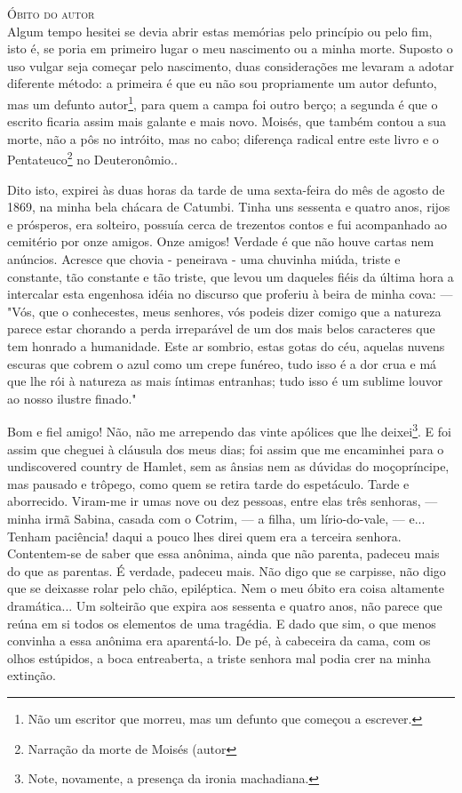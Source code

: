 \begin{corollary}[Capítulo I]
\textsc{Óbito do autor} \\

Algum tempo hesitei se devia abrir estas memórias pelo princípio ou pelo fim, isto é, se poria em primeiro lugar o meu nascimento ou a minha morte. Suposto o uso vulgar seja começar pelo nascimento, duas considerações me levaram a adotar diferente método: a primeira é que eu não sou propriamente um autor defunto, mas um defunto autor\footnote{Não um escritor que morreu, mas um defunto que começou a escrever.}, para quem a campa foi outro berço; a segunda é que o escrito ficaria assim mais galante e mais novo. Moisés, que também contou a sua morte, não a pôs no intróito, mas no cabo; diferença radical entre este livro e o Pentateuco\footnote{Narração da morte de Moisés (autor} no Deuteronômio..

Dito isto, expirei às duas horas da tarde de uma sexta-feira do mês de agosto de 1869, na minha bela chácara de Catumbi. Tinha uns sessenta e quatro anos, rijos e prósperos, era solteiro, possuía cerca de trezentos contos e fui acompanhado ao cemitério por onze amigos. Onze amigos! Verdade é que não houve cartas nem anúncios. Acresce que chovia - peneirava - uma chuvinha miúda, triste e constante, tão constante e tão triste, que levou um daqueles fiéis da última hora a intercalar esta engenhosa idéia no discurso que proferiu à beira de minha cova: — "Vós, que o conhecestes, meus senhores, vós podeis dizer comigo que a natureza parece estar chorando a perda irreparável de um dos mais belos caracteres que tem honrado a humanidade. Este ar sombrio, estas gotas do céu, aquelas nuvens escuras que cobrem o azul como um crepe funéreo, tudo isso é a dor crua e má que lhe rói à natureza as mais íntimas entranhas; tudo isso é um sublime louvor ao nosso ilustre finado."

Bom e fiel amigo! Não, não me arrependo das vinte apólices que lhe deixei\footnote{Note, novamente, a presença da ironia machadiana.}. E foi assim que cheguei à cláusula dos meus dias; foi assim que me encaminhei para o undiscovered country de Hamlet, sem as ânsias nem as dúvidas do moçopríncipe, mas pausado e trôpego, como quem se retira tarde do espetáculo. Tarde e aborrecido. Viram-me ir umas nove ou dez pessoas, entre elas três senhoras, — minha irmã Sabina, casada com o Cotrim, — a filha, um lírio-do-vale, — e... Tenham paciência! daqui a pouco lhes direi quem era a terceira senhora. Contentem-se de saber que essa anônima, ainda que não parenta, padeceu mais do que as parentas. É verdade, padeceu mais. Não digo que se carpisse, não digo que se deixasse rolar pelo chão, epiléptica. Nem o meu óbito era coisa altamente dramática... Um solteirão que expira aos sessenta e quatro anos, não parece que reúna em si todos os elementos de uma tragédia. E dado que sim, o que menos convinha a essa anônima era aparentá-lo. De pé, à cabeceira da cama, com os olhos estúpidos, a boca entreaberta, a triste senhora mal podia crer na minha extinção.


\end{corollary}
